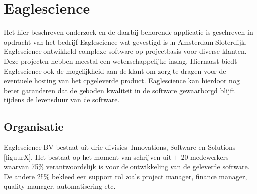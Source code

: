 \chapter{Eaglescience}\label{ch:eaglescience} %

\label{ch:Eaglescience} %


Het hier beschreven onderzoek en de daarbij behorende applicatie is geschreven in opdracht van het bedrijf Eaglescience wat gevestigd is in Amsterdam Sloterdijk.
Eaglescience ontwikkeld complexe software op projectbasis voor diverse klanten.
Deze projecten hebben meestal een wetenschappelijke inslag.
Hiernaast biedt Eaglescience ook de mogelijkheid aan de klant om zorg te dragen voor de eventuele hosting van het opgeleverde product.
Eaglescience kan hierdoor nog beter garanderen dat de geboden kwaliteit in de software gewaarborgd blijft tijdens de levensduur van de software.

\section{Organisatie}\label{sec:organisatie}

Eaglescience BV bestaat uit drie divisies: Innovations, Software en Solutions [figuurX].%
Het bestaat op het moment van schrijven uit $\pm$ 20 medewerkers waarvan 75\% verantwoordelijk is voor de ontwikkeling van de geleverde software.
De andere 25\% bekleed een support rol zoals project manager, finance manager, quality manager, automatisering etc.

